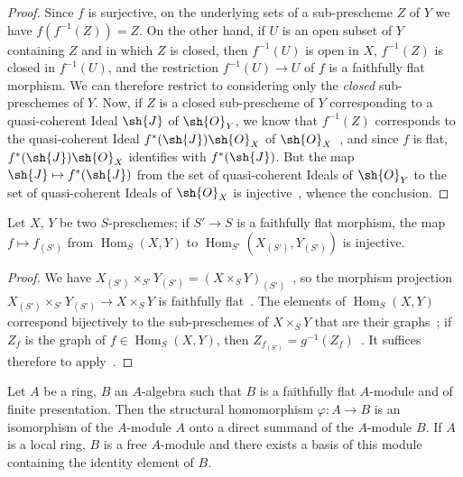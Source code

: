 \begin{proof}
Since $f$ is surjective, on the underlying sets of a sub-prescheme $Z$ of $Y$ we have $f(f^{-1}(Z))=Z$.
On the other hand, if $U$ is an open subset of $Y$ containing $Z$ and in which $Z$ is closed, then $f^{-1}(U)$ is open in $X$, $f^{-1}(Z)$ is closed in $f^{-1}(U)$, and the restriction $f^{-1}(U)\to U$ of $f$ is a faithfully flat morphism.
We can therefore restrict to considering only the \emph{closed} sub-preschemes of $Y$.
Now, if $Z$ is a closed sub-prescheme of $Y$ corresponding to a quasi-coherent Ideal $\sh{J}$ of $\sh{O}_Y$, we know that $f^{-1}(Z)$ corresponds to the quasi-coherent Ideal $f^*(\sh{J})\sh{O}_X$ of $\sh{O}_X$~, and since $f$ is flat, $f^*(\sh{J})\sh{O}_X$ identifies with $f^*(\sh{J})$.
But the map $\sh{J}\mapsto f^*(\sh{J})$ from the set of quasi-coherent Ideals of $\sh{O}_Y$ to the set of quasi-coherent Ideals of $\sh{O}_X$ is injective~, whence the conclusion.
\end{proof}

\begin{corollary}[2.2.16]
\label{IV.2.2.16}
Let $X$, $Y$ be two $S$-preschemes; if $S'\to S$ is a faithfully flat morphism, the map $f\mapsto f_{(S')}$ from $\operatorname{Hom}_S(X,Y)$ to $\operatorname{Hom}_{S'}(X_{(S')},Y_{(S')})$ is injective.
\end{corollary}

\begin{proof}
We have $X_{(S')}\times_{S'}Y_{(S')}=(X\times_S Y)_{(S')}$~, so the morphism projection $X_{(S')}\times_{S'}Y_{(S')}\to X\times_S Y$ is faithfully flat~.
The elements of $\operatorname{Hom}_S(X,Y)$ correspond bijectively to the sub-preschemes of $X\times_S Y$ that are their graphs~; if $Z_f$ is the graph of $f\in\operatorname{Hom}_S(X,Y)$, then $Z_{f_{(S')}}=g^{-1}(Z_f)$~.
It suffices therefore to apply~.
\end{proof}

\begin{proposition}[2.2.17]
\label{IV.2.2.17}
Let $A$ be a ring, $B$ an $A$-algebra such that $B$ is a faithfully flat $A$-module and of finite presentation.
Then the structural homomorphism $\varphi:A\to B$ is an isomorphism of the $A$-module $A$ onto a direct summand of the $A$-module $B$.
If $A$ is a local ring, $B$ is a free $A$-module and there exists a basis of this module containing the identity element of $B$.
\end{proposition}

